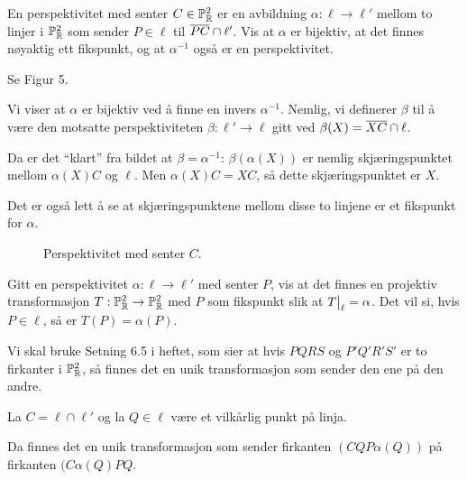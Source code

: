\documentclass[11pt, norsk]{article}
\begin{document}
\begin{oppg}
 En perspektivitet med senter $C \in \mathbb{P}_{\mathbb{R}}^2$ er en avbildning ${\alpha:\ell \to \ell'}$ mellom to linjer i $\mathbb{P}_{\mathbb{R}}^2$ som sender $P \in \ell$ til $\overline{PC} \cap \ell'$. Vis at $\alpha$ er bijektiv, at det finnes nøyaktig ett fikspunkt, og at $\alpha^{-1}$ også er en perspektivitet.
\end{oppg}
\begin{losn}
Se Figur 5. 

Vi viser at $\alpha$ er bijektiv ved å finne en invers $\alpha^{-1}$. Nemlig, vi definerer $\beta$ til å være den motsatte perspektiviteten $\beta:\ell' \to \ell$ gitt ved $\beta(X)=\overline{XC} \cap \ell$. 

Da er det ``klart'' fra bildet at $\beta= \alpha^{-1}$: $\beta(\alpha(X))$ er nemlig skjæringspunktet mellom $\alpha(X)C$ og $\ell$. Men $\alpha(X)C=XC$, så dette skjæringspunktet er $X$.

Det er også lett å se at skjæringspunktene mellom disse to linjene er et fikspunkt for $\alpha$.
  \begin{figure}
\centering
    \caption{Perspektivitet med senter $C$.}
  \end{figure}
\end{losn}

\begin{oppg}
 Gitt en perspektivitet $\alpha:\ell \to \ell'$ med senter $P$, vis at det finnes en projektiv transformasjon $T: \mathbb{P}_{\mathbb{R}}^2 \to \mathbb{P}_{\mathbb{R}}^2$ med $P$ som fikspunkt slik at $\restr{T}{\ell}=\alpha$. Det vil si, hvis $P \in \ell$, så er $T(P)=\alpha(P)$.
\end{oppg}

\begin{losn}
Vi skal bruke Setning 6.5 i heftet, som sier at hvis $PQRS$ og $P'Q'R'S'$ er to firkanter i $\mathbb{P}_{\mathbb{R}}^2$, så finnes det en unik transformasjon som sender den ene på den andre.

La $C = \ell \cap \ell'$ og la $Q \in \ell$ være et vilkårlig punkt på linja.

Da finnes det en unik transformasjon som sender firkanten $(CQP\alpha(Q))$ på firkanten $(C\alpha(Q)PQ$. 
\end{losn}
\end{document}
